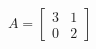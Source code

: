 \documentclass[preview]{standalone}
\begin{document}
\begin{align*}
A = \begin{bmatrix} 3 & 1 \\ 0& 2 \end{bmatrix}
\end{align*}
\end{document}
